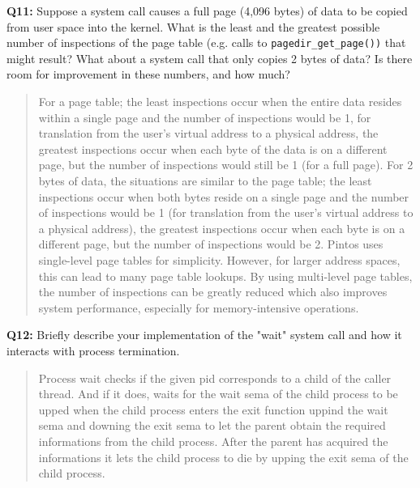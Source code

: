 \documentclass[a4paper,11pt]{paper}
\begin{document}
\textbf{Q11:} Suppose a system call causes a full page (4,096 bytes) of data to be copied from user space into the kernel.  What is the least and the greatest possible number of inspections of the page table (e.g. calls to \texttt{pagedir\_get\_page())} that might result?  What about a system call that only copies 2 bytes of data?  Is there room for improvement in these numbers, and how much?
\begin{quote}
  For a page table; the least inspections occur when the entire data resides within a single page and the number of inspections would be 1, for translation from the user's virtual address to a physical address, the greatest inspections occur when each byte of the data is on a different page, but the number of inspections would still be 1 (for a full page).
  For 2 bytes of data, the situations are similar to the page table; the least inspections occur when both bytes reside on a single page and the number of inspections would be 1 (for translation from the user's virtual address to a physical address), the greatest inspections occur when each byte is on a different page, but the number of inspections would be 2.
  Pintos uses single-level page tables for simplicity. However, for larger address spaces, this can lead to many page table lookups. By using multi-level page tables, the number of inspections can be greatly reduced which also improves system performance, especially for memory-intensive operations.
\end{quote}

\textbf{Q12:} Briefly describe your implementation of the "wait" system call and how it interacts with process termination.
\begin{quote}
  Process wait checks if the given pid corresponds to a child of the caller thread. And if it does, waits for the wait sema of the child process to be upped when the child process enters the exit function uppind the wait sema and downing the exit sema to let the parent obtain the required informations from the child process. After the parent has acquired the informations it lets the child process to die by upping the exit sema of the child process.
\end{quote}
\end{document}
